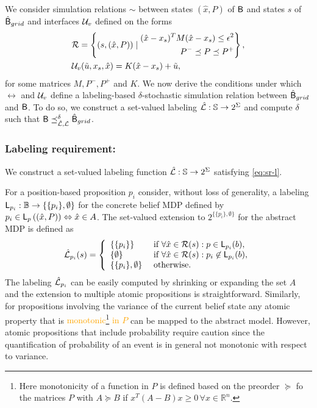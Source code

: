 \documentclass{ifacconf}
\newcommand{\red}[1]{{\color{red} #1}}
\begin{document}
We consider simulation relations $\sim$ between states $(\hat x, P)$ of $\mathsf{B}$ and states $s$ of $\hat {\mathsf{B}}_{grid}$ and interfaces $\mathcal{U}_{v}$ defined on the forms
\begin{align}
  \label{eq:rel}
    & \mathcal{R} = \left\{(s, (\hat x, P ) ) \mid \begin{aligned}
      (\hat x-x_s)^T M(\hat x-x_s)\leq \epsilon^2 \\
      P^-\preceq P \preceq   P^+
    \end{aligned} \right \}, \\
    & \mathcal{U}_{v}(\tilde u,  x_s, \hat x)  =K( \hat x - x_s)+\tilde u,
\end{align}
for some matrices $M, P^-, P^+$ and $K$. We now derive the conditions under which $\rel$ and $\mathcal{U}_{v}$ define a labeling-based $\delta$-stochastic simulation relation between $\hat {\mathsf{B}}_{grid}$ and $\mathsf{B}$. To do so, we construct a set-valued labeling $\hat {\mathcal{L}}: \mathbb{S} \rightarrow 2^\Sigma$ and compute $\delta$ such that $\mathsf{B}\preceq^\delta_{\hat{\mathcal{L}},\mathcal{L}}\hat {\mathsf{B}}_{grid}$.

\subsubsection{Labeling requirement:}

We construct a set-valued labeling function $\hat {\mathcal{L}}: \mathbb{S} \rightarrow 2^\Sigma$ satisfying \eqref{eq:sr-l}.

For a position-based proposition $p_i$ consider, without loss of generality, a labeling $\mathsf{L}_{p_i}: \mathbb{B} \rightarrow \{\{p_i\},\emptyset\}$ for the concrete belief MDP defined by $p_i\in\mathsf{L}_p \left( (\hat x,P) \right)  \Leftrightarrow \hat x \in A$. The set-valued extension to $2^{\{\{p_i\},\emptyset\}}$ for the abstract MDP is defined as
 \begin{align}
 	\hat {\mathcal{L}}_{p_i}(s) =\left\{\begin{array}{ll} \{\{p_i\}\} & \mbox{ if } \forall \hat x \in \mathcal{R} (s):p\in\mathsf{L}_{p_i}(b), \\
 	  \{\emptyset \} & \mbox{ if } \forall \hat x \in \mathcal{R} (s):{p_i}\not\in\mathsf{L}_{p_i}(b),\\
 	  \{\{p_i\},\emptyset\}&\mbox{ otherwise.}\end{array} \right.
 \end{align}
The labeling $\hat {\mathcal{L}}_{p_i}$ can be easily computed by shrinking or expanding the set $A$ and the extension to multiple atomic propositions is straightforward. Similarly, for propositions involving the variance of the current belief state any atomic property that is \textcolor{orange}{monotonic\footnote{\color{orange}Here monotonicity of a function in $P$ is defined based on the preorder $\succeq $ fo the matrices $P$ with $A\succeq B$ if $x^T(A-B)x\geq0\, \forall x\in\mathbb R^n$. } in $P$} can be mapped to the abstract model. However, atomic propositions that include probability require caution since the quantification of probability of an event is in general not \red{monotonic} with respect to variance.
\end{document}
